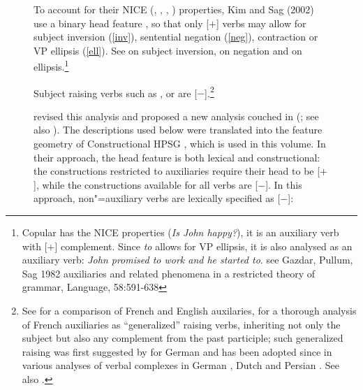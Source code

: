\documentclass[output=paper
                ,modfonts
                ,nonflat
	        ,collection
	        ,collectionchapter
	        ,collectiontoclongg
 	        ,biblatex
                ,babelshorthands
                ,newtxmath
                ,draftmode
                ,colorlinks, citecolor=brown
]{./langsci/langscibook}
\begin{document}
\begin{figure}
To account for their NICE (, , , ) properties, Kim and Sag (2002) use a binary head feature \aux, so that only [\aux $+$] verbs may allow for subject inversion (\ref{inv}), sentential negation (\ref{neg}), contraction or VP ellipsis (\ref{ell}). See   on subject inversion,  on negation and  on ellipsis.\footnote{Copular  has the NICE properties (\textit{Is John happy?}), it is an auxiliary verb with [\prd $+$] complement. Since \emph{to} allows for VP ellipsis, it is also analysed as an auxiliary verb: \emph{John promised to work and he started to}. see Gazdar, Pullum, Sag 1982 auxiliaries and related phenomena in a restricted theory of grammar, Language, 58:591-638}

\eal
{}
\zl

\noindent
Subject raising verbs such as ,  or  are [\aux $-$].\footnote{See  for a comparison of French and English auxilaries,  for a thorough analysis of French auxiliaries as ``generalized'' raising verbs, inheriting not only the subject but also any complement from the past participle; such generalized raising was first suggested by \citet{HN89a,HN94a} for German and has been adopted since in various analyses of verbal complexes in German \citep{Kiss95a,Meurers2000b,Kathol2001a,Mueller99a,Mueller2002b}, Dutch \citep{BvN98a} and Persian \citep[Section~4]{MuellerPersian}. See also .}

\citet{Sagetal2020} revised this analysis and proposed a new analysis couched in \sbcg (\citealp{Sag2012a}; see also ). The descriptions used below were translated into the feature geometry of Constructional HPSG \citep{Sag97a}, which is used in this volume. In their approach, the head feature \aux is both lexical and constructional: the constructions restricted to auxiliaries require their head to be [\aux $+$], while the constructions available for all verbs are [\aux $-$]. In this approach, non"=auxiliary verbs are lexically specified as [\aux $-$]:


\end{figure}
\end{document}
